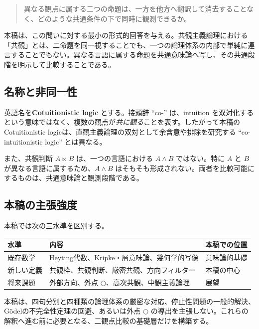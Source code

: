 \documentclass[a4paper,11pt]{ltjsarticle}
\theoremstyle{definition}
\theoremstyle{plain}
\newcommand{\dfix}{\bigcirc}
\begin{document}
\begin{quote}
異なる観点に属する二つの命題は、一方を他方へ翻訳して消去することなく、どのような共通条件の下で同時に観測できるか。
\end{quote}

本稿は、この問いに対する最小の形式的回答を与える。共観主義論理における「共観」とは、二命題を同一視することでも、一つの論理体系の内部で単純に連言することでもない。異なる言語に属する命題を共通意味論へ写し、その共通段階を明示して比較することである。

\subsection{名称と非同一性}

英語名を\textbf{Cotuitionistic logic} とする。接頭辞 ``co-'' は、intuition を双対化するという意味ではなく、複数の観点が\emph{共に観る}ことを表す。したがって本稿のCotuitionistic logicは、直観主義論理の双対として余含意や排除を研究する ``co-intuitionistic logic'' とは異なる。

また、共観判断 $A\bowtie B$ は、一つの言語における $A\land B$ ではない。特に $A$ と $B$ が異なる言語に属するため、$A\land B$ はそもそも形成されない。両者を比較可能にするものは、共通意味論と観測段階である。

\subsection{本稿の主張強度}

本稿では次の三水準を区別する。

\begin{center}
\begin{tabular}{p{} p{} p{}}
\toprule
水準 & 内容 & 本稿での位置 \\
\midrule
既存数学 & Heyting代数、Kripke・層意味論、幾何学的写像 & 意味論的基礎 \\
新しい定義 & 共観枠、共観判断、厳密共観、方向フィルター & 本稿の中心 \\
将来課題 & 外部方向、外点 $\dfix$、高次共観、中観主義論理 & 展望 \\
\bottomrule
\end{tabular}
\end{center}

本稿は、四句分別と四種類の論理体系の厳密な対応、停止性問題の一般的解決、Gödelの不完全性定理の回避、あるいは外点 $\dfix$ の導出を主張しない。これらの解釈へ進む前に必要となる、二観点比較の基礎層だけを構築する。
\end{document}
